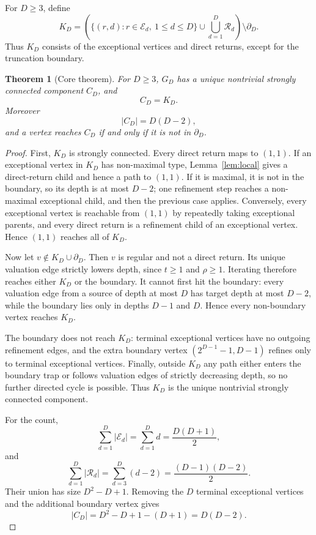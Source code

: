\documentclass[11pt]{article}
\newtheorem{theorem}{Theorem}[section]
\theoremstyle{definition}
\theoremstyle{remark}
\newcommand{\Ecal}{\mathcal E}
\newcommand{\Rcal}{\mathcal R}
\newcommand{\bdD}{\partial_D}
\begin{document}
For $D\ge3$, define
\[
K_D=\left(\{(r,d):r\in\Ecal_d,\ 1\le d\le D\}\cup\bigcup_{d=1}^D\Rcal_d\right)\setminus\bdD.
\]
Thus $K_D$ consists of the exceptional vertices and direct returns, except for the truncation boundary.

\begin{theorem}[Core theorem]\label{thm:core}
For $D\ge3$, $G_D$ has a unique nontrivial strongly connected component $C_D$, and
\[
C_D=K_D.
\]
Moreover
\[
|C_D|=D(D-2),
\]
and a vertex reaches $C_D$ if and only if it is not in $\bdD$.
\end{theorem}

\begin{proof}
First, $K_D$ is strongly connected.  Every direct return maps to $(1,1)$.  If an exceptional vertex in $K_D$ has non-maximal type, Lemma~\ref{lem:local} gives a direct-return child and hence a path to $(1,1)$.  If it is maximal, it is not in the boundary, so its depth is at most $D-2$; one refinement step reaches a non-maximal exceptional child, and then the previous case applies.  Conversely, every exceptional vertex is reachable from $(1,1)$ by repeatedly taking exceptional parents, and every direct return is a refinement child of an exceptional vertex.  Hence $(1,1)$ reaches all of $K_D$.

Now let $v\notin K_D\cup\bdD$.  Then $v$ is regular and not a direct return.  Its unique valuation edge strictly lowers depth, since $t\ge1$ and $\rho\ge1$.  Iterating therefore reaches either $K_D$ or the boundary.  It cannot first hit the boundary: every valuation edge from a source of depth at most $D$ has target depth at most $D-2$, while the boundary lies only in depths $D-1$ and $D$.  Hence every non-boundary vertex reaches $K_D$.

The boundary does not reach $K_D$: terminal exceptional vertices have no outgoing refinement edges, and the extra boundary vertex $(2^{D-1}-1,D-1)$ refines only to terminal exceptional vertices.  Finally, outside $K_D$ any path either enters the boundary trap or follows valuation edges of strictly decreasing depth, so no further directed cycle is possible.  Thus $K_D$ is the unique nontrivial strongly connected component.

For the count,
\[
\sum_{d=1}^D |\Ecal_d|=\sum_{d=1}^D d=\frac{D(D+1)}2,
\]
and
\[
\sum_{d=1}^D |\Rcal_d|=\sum_{d=3}^D(d-2)=\frac{(D-1)(D-2)}2.
\]
Their union has size $D^2-D+1$.  Removing the $D$ terminal exceptional vertices and the additional boundary vertex gives
\[
|C_D|=D^2-D+1-(D+1)=D(D-2).
\]
\end{proof}
\end{document}

